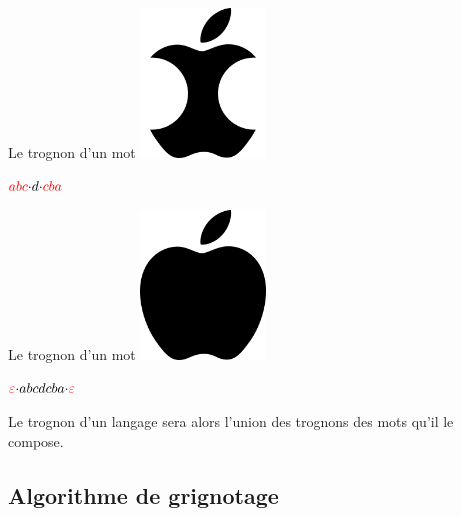 \begin{frame}{\myframetitle}
  \begin{block}{Le trognon d'un mot}
    \centering
    \includegraphics[width=0.25\textwidth]{./resources/empty_apple.png}

    \pause[]

    \vphantom{}

    \Large{\(\color{red}{abc} \color{black}{\cdot d \cdot} \color{red}{cba}\)}
  \end{block}
\end{frame}

\begin{frame}{\myframetitle}
  \begin{block}{Le trognon d'un mot}
    \centering
    \includegraphics[width=0.25\textwidth]{./resources/full_apple.png}

    \pause[]

    \vphantom{}

    \Large{\(\color{red}{\varepsilon} \color{black}{\cdot abcdcba \cdot}
    \color{red}{\varepsilon}\)}
  \end{block}
\end{frame}

\begin{frame}{\myframetitle}
  \begin{definition}
    Le trognon d'un langage sera alors l'union des trognons des mots qu'il le
    compose.
  \end{definition}
\end{frame}

\subsection{Algorithme de grignotage}

